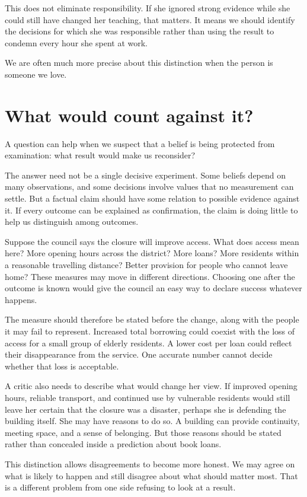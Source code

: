 \documentclass[12pt,a4paper]{book}
\begin{document}
This does not eliminate responsibility. If she ignored strong evidence while she could still have changed her teaching, that matters. It means we should identify the decisions for which she was responsible rather than using the result to condemn every hour she spent at work.

We are often much more precise about this distinction when the person is someone we love.

\section*{What would count against it?}

A question can help when we suspect that a belief is being protected from examination: what result would make us reconsider?

The answer need not be a single decisive experiment. Some beliefs depend on many observations, and some decisions involve values that no measurement can settle. But a factual claim should have some relation to possible evidence against it. If every outcome can be explained as confirmation, the claim is doing little to help us distinguish among outcomes.

Suppose the council says the closure will improve access. What does access mean here? More opening hours across the district? More loans? More residents within a reasonable travelling distance? Better provision for people who cannot leave home? These measures may move in different directions. Choosing one after the outcome is known would give the council an easy way to declare success whatever happens.

The measure should therefore be stated before the change, along with the people it may fail to represent. Increased total borrowing could coexist with the loss of access for a small group of elderly residents. A lower cost per loan could reflect their disappearance from the service. One accurate number cannot decide whether that loss is acceptable.

A critic also needs to describe what would change her view. If improved opening hours, reliable transport, and continued use by vulnerable residents would still leave her certain that the closure was a disaster, perhaps she is defending the building itself. She may have reasons to do so. A building can provide continuity, meeting space, and a sense of belonging. But those reasons should be stated rather than concealed inside a prediction about book loans.

This distinction allows disagreements to become more honest. We may agree on what is likely to happen and still disagree about what should matter most. That is a different problem from one side refusing to look at a result.
\end{document}
